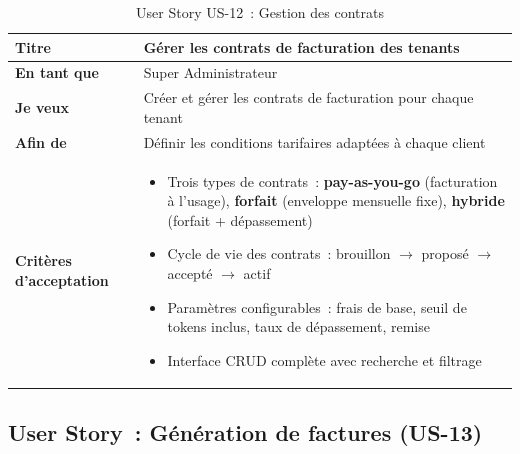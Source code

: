 \begin{table}[H]
\centering
\caption{User Story US-12~: Gestion des contrats}
\label{tab:us12}
\begin{tabularx}{\textwidth}{|l|X|}
\hline
\textbf{Titre} & Gérer les contrats de facturation des tenants \\
\hline
\textbf{En tant que} & Super Administrateur \\
\hline
\textbf{Je veux} & Créer et gérer les contrats de facturation pour chaque tenant \\
\hline
\textbf{Afin de} & Définir les conditions tarifaires adaptées à chaque client \\
\hline
\textbf{Critères d'acceptation} & \begin{minipage}[t]{\linewidth}\vspace{2pt}
\begin{itemize}[noitemsep,topsep=0pt]
\item Trois types de contrats~: \textbf{pay-as-you-go} (facturation à l'usage), \textbf{forfait} (enveloppe mensuelle fixe), \textbf{hybride} (forfait + dépassement)
\item Cycle de vie des contrats~: brouillon $\rightarrow$ proposé $\rightarrow$ accepté $\rightarrow$ actif
\item Paramètres configurables~: frais de base, seuil de tokens inclus, taux de dépassement, remise
\item Interface CRUD complète avec recherche et filtrage
\end{itemize}\vspace{2pt}
\end{minipage} \\
\hline
\end{tabularx}
\end{table}

\subsection{User Story~: Génération de factures (US-13)}

